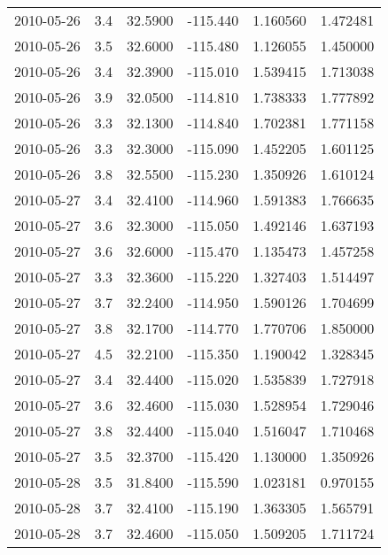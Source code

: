 \begin{tabular}{lrrrrr}
2010-05-26 &       3.4 &  32.5900 &  -115.440 &         1.160560 &         1.472481 \\
2010-05-26 &       3.5 &  32.6000 &  -115.480 &         1.126055 &         1.450000 \\
2010-05-26 &       3.4 &  32.3900 &  -115.010 &         1.539415 &         1.713038 \\
2010-05-26 &       3.9 &  32.0500 &  -114.810 &         1.738333 &         1.777892 \\
2010-05-26 &       3.3 &  32.1300 &  -114.840 &         1.702381 &         1.771158 \\
2010-05-26 &       3.3 &  32.3000 &  -115.090 &         1.452205 &         1.601125 \\
2010-05-26 &       3.8 &  32.5500 &  -115.230 &         1.350926 &         1.610124 \\
2010-05-27 &       3.4 &  32.4100 &  -114.960 &         1.591383 &         1.766635 \\
2010-05-27 &       3.6 &  32.3000 &  -115.050 &         1.492146 &         1.637193 \\
2010-05-27 &       3.6 &  32.6000 &  -115.470 &         1.135473 &         1.457258 \\
2010-05-27 &       3.3 &  32.3600 &  -115.220 &         1.327403 &         1.514497 \\
2010-05-27 &       3.7 &  32.2400 &  -114.950 &         1.590126 &         1.704699 \\
2010-05-27 &       3.8 &  32.1700 &  -114.770 &         1.770706 &         1.850000 \\
2010-05-27 &       4.5 &  32.2100 &  -115.350 &         1.190042 &         1.328345 \\
2010-05-27 &       3.4 &  32.4400 &  -115.020 &         1.535839 &         1.727918 \\
2010-05-27 &       3.6 &  32.4600 &  -115.030 &         1.528954 &         1.729046 \\
2010-05-27 &       3.8 &  32.4400 &  -115.040 &         1.516047 &         1.710468 \\
2010-05-27 &       3.5 &  32.3700 &  -115.420 &         1.130000 &         1.350926 \\
2010-05-28 &       3.5 &  31.8400 &  -115.590 &         1.023181 &         0.970155 \\
2010-05-28 &       3.7 &  32.4100 &  -115.190 &         1.363305 &         1.565791 \\
2010-05-28 &       3.7 &  32.4600 &  -115.050 &         1.509205 &         1.711724 \\

\end{tabular}
